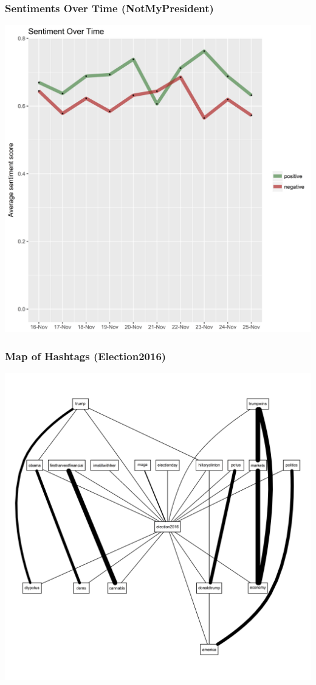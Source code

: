 \documentclass{beamer}
\begin{document}
\begin{frame}
	\frametitle{Sentiments Over Time (NotMyPresident)}
  \includegraphics[height = 0.9\textheight]{nmpsentiments}
\end{frame}

\begin{frame}
	\frametitle{Map of Hashtags (Election2016)}
  \includegraphics[height = 0.9\textheight]{e2016hashmap}
\end{frame}
\end{document}
